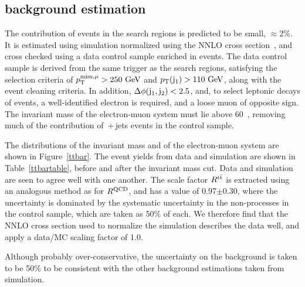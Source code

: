 \subsection{\ttbar background estimation}
\label{sec:ttbar}
The contribution of \ttbar events in the search regions is predicted to be small, $\approx2\%$.
It is estimated using simulation normalized using the \ac{NNLO} cross section~\cite{ttbarxs}, 
and cross checked using a data control sample enriched in \ttbar events. 
The data control sample is derived from the same trigger as the search regions, satisfying the selection criteria of $p^{\rm miss, \mu}_{\rm T}>250~\mathrm{GeV}$ and $p_{\text{T}}({\rm j}_1)>110~\mathrm{GeV}$, along with the event cleaning criteria. 
In addition, $\Delta \phi({\rm j}_1, {\rm j}_2)<2.5$, and, to select leptonic decays of \ttbar events, 
a well-identified electron is required, and a loose muon of opposite sign. 
The invariant mass of the electron-muon system must lie above 60~\GeV, removing much of the contribution of \zellellbr{}\,+\,jets events in the control sample. 

The distributions of the invariant mass and \pt{} of the electron-muon system are shown in Figure~\ref{ttbar}.
The event yields from data and simulation are shown in 
Table~\ref{ttbartable}, before and after the invariant mass cut.  
Data and simulation are seen to agree well with one another.
The scale factor $R^{{\rm t\bar{t}}}$ is extracted using an analogous method as for $R^{\rm QCD}$, and has a value of 0.97$\pm$0.30, where the uncertainty is dominated by the systematic uncertainty in the non-\ttbar processes in the control sample, 
which are taken as 50\% of each.
We therefore find that the \ac{NNLO} cross section used to normalize the \ttbar simulation describes the data well, and apply a data/MC scaling factor of 1.0.

Although probably over-conservative, the uncertainty on the \ttbar background is taken to be 50\% to be consistent with the other background estimations taken from simulation. 

